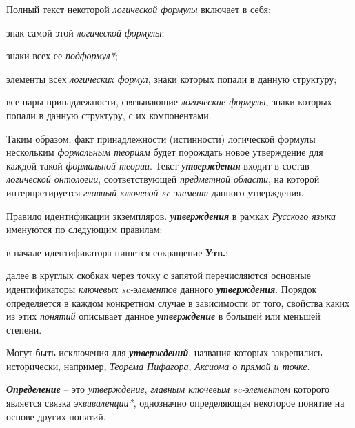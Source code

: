 Полный текст некоторой \textit{логической формулы} включает в себя:
\begin{textitemize}
	\item{знак самой этой \textit{логической формулы}};
	\item{знаки всех ее \textit{подформул*}};
	\item{элементы всех \textit{логических формул}, знаки которых попали в данную структуру;}
	\item{все пары принадлежности, связывающие \textit{логические формулы}, знаки которых попали в данную структуру, с их компонентами.}
\end{textitemize}

Таким образом, факт принадлежности (истинности) логической формулы нескольким \textit{формальным теориям} будет порождать новое утверждение для каждой такой \textit{формальной теории}. Текст \textbf{\textit{утверждения}} входит в состав \textit{логической онтологии}, соответствующей \textit{предметной области}, на которой интерпретируется \textit{главный ключевой sc-элемент\scnrolesign} данного утверждения.

Правило идентификации экземпляров. \textbf{\textit{утверждения}} в рамках \textit{Русского языка} именуются по следующим правилам:
\begin{textitemize}
	\item{в начале идентификатора пишется сокращение \textbf{Утв.};}
	\item{далее в круглых скобках через точку с запятой перечисляются основные идентификаторы \textit{ключевых \mbox{sc-элементов}\scnrolesign} данного \textbf{\textit{утверждения}}. Порядок определяется в каждом конкретном случае в зависимости от того, свойства каких из этих \textit{понятий} описывает данное \textbf{\textit{утверждение}} в большей или меньшей степени.}
\end{textitemize}

Могут быть исключения для \textbf{\textit{утверждений}}, названия которых закрепились исторически, например, \textit{Теорема Пифагора}, \textit{Аксиома о прямой и точке}.



\textbf{\textit{Определение}} -- это \textit{утверждение}, \textit{главным ключевым sc-элементом\scnrolesign} которого является связка \textit{эквиваленции*}, однозначно определяющая некоторое понятие на основе других понятий.

